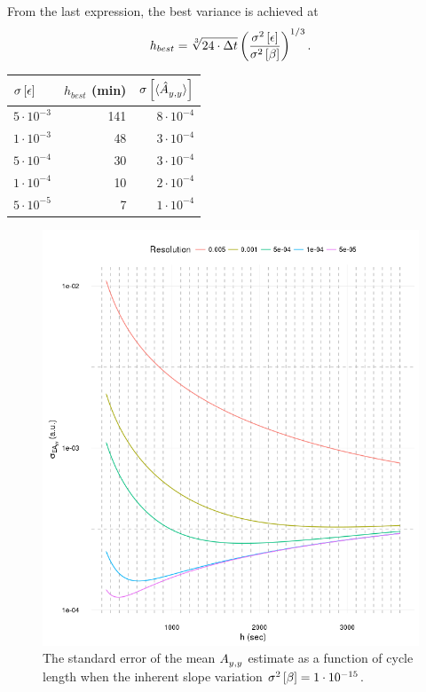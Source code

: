 \documentclass{article}
\begin{document}
From the last expression, the best variance is achieved at
\begin{equation}
	h_{best} = \sqrt[3]{24\cdot \Tint} \bkt{\frac{\v{\err}}{\v{\slp}}}^{1/3}.
\end{equation}

\begin{table}
\centering
\begin{tabular}{lrr}
\hline\hline
$\SE{\err}$			&	$h_{best}$ (min)	& $\SE{\avg{\Ayy*}}$\\
\hline
$5\cdot10^{-3}$		&	141					& $8\cdot10^{-4}$\\
$1\cdot10^{-3}$		&	48					& $3\cdot10^{-4}$\\
$5\cdot10^{-4}$		&	30					& $3\cdot10^{-4}$\\
$1\cdot10^{-4}$		&	10					& $2\cdot10^{-4}$\\
$5\cdot10^{-5}$		&	7					& $1\cdot10^{-4}$\\
\end{tabular}
\end{table}

\begin{figure}
\includegraphics[scale=1]{AyySE_varb_15}
\caption{The standard error of the mean $\Ayy$ estimate as a function of cycle length when the inherent slope variation $\v{\slp} = 1\cdot10^{-15}$.}
\end{figure}
\end{document}
